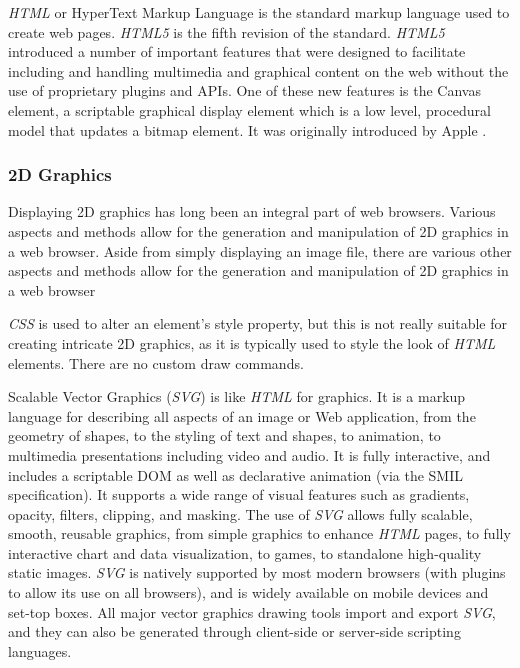 \documentclass[a4paper,11pt,titlepage]{article}
\begin{document}
\textit{HTML} or HyperText Markup Language is the standard markup language used to create web pages. \textit{HTML5} is the fifth revision of the standard. \textit{HTML5} introduced a number of important features that were designed to facilitate including and handling multimedia and graphical content on the web without the use of proprietary plugins and APIs. One of these new features is the Canvas element, a scriptable graphical display element which is a low level, procedural model that updates a bitmap element. It was originally introduced by Apple \cite{canvas} .

\subsubsection{2D Graphics}

Displaying 2D graphics has long been an integral part of web browsers. Various aspects and methods allow for the generation and manipulation of 2D graphics in a web browser. Aside from simply displaying an image file, there are various other aspects and methods allow for the generation and manipulation of 2D graphics in a web browser

\textit{CSS} is used to alter an element's style property, but this is not really suitable for creating intricate 2D graphics, as it is typically used to style the look of \textit{HTML} elements. There are no custom draw commands.

Scalable Vector Graphics (\textit{SVG}) is like \textit{HTML} for graphics\cite{svg}. It is a markup language for describing all aspects of an image or Web application, from the geometry of shapes, to the styling of text and shapes, to animation, to multimedia presentations including video and audio. It is fully interactive, and includes a scriptable DOM as well as declarative animation (via the SMIL specification). It supports a wide range of visual features such as gradients, opacity, filters, clipping, and masking.
The use of \textit{SVG} allows fully scalable, smooth, reusable graphics, from simple graphics to enhance \textit{HTML} pages, to fully interactive chart and data visualization, to games, to standalone high-quality static images. \textit{SVG} is natively supported by most modern browsers (with plugins to allow its use on all browsers), and is widely available on mobile devices and set-top boxes. All major vector graphics drawing tools import and export \textit{SVG}, and they can also be generated through client-side or server-side scripting languages.
\end{document}

